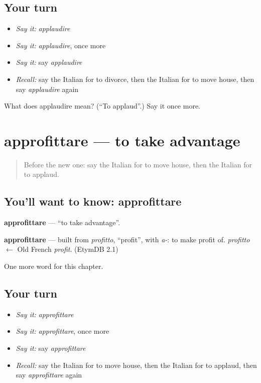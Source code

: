 \subsection*{Your turn}
\begin{itemize}
\raggedright
  \item \emph{Say it:} \emph{applaudire}
  \item \emph{Say it:} \emph{applaudire}, once more
  \item \emph{Say it:} say \emph{applaudire}
  \item \emph{Recall:} say the Italian for to divorce, then the Italian for to move house, then say \emph{applaudire} again
\end{itemize}

\begin{tcolorbox}[breakable,colback=teal!4,colframe=teal!35!black,title={Before you move on}]
What does applaudire mean? (\textquotedblleft{}To applaud\textquotedblright{}.) Say it once more.
\end{tcolorbox}
\section[approfittare]{approfittare — to take advantage}

\label{lesson:IT-C208-approfittare}



\begin{quote}
Before the new one: say the Italian for to move house, then the Italian for to applaud.
\end{quote}

\subsection*{You'll want to know: approfittare}
\textbf{approfittare} — \textquotedblleft{}to take advantage\textquotedblright{}.

\begin{cousinweb}
\textbf{approfittare} — built from \emph{profitto}, \textquotedblleft{}profit\textquotedblright{}, with \emph{a-}: to make profit of. \emph{profitto} $\leftarrow$ Old French \emph{profit}. (EtymDB 2.1)
\end{cousinweb}

\begin{grammarlens}[title={What you've built}]
One more word for this chapter.
\end{grammarlens}

\subsection*{Your turn}
\begin{itemize}
\raggedright
  \item \emph{Say it:} \emph{approfittare}
  \item \emph{Say it:} \emph{approfittare}, once more
  \item \emph{Say it:} say \emph{approfittare}
  \item \emph{Recall:} say the Italian for to move house, then the Italian for to applaud, then say \emph{approfittare} again
\end{itemize}

